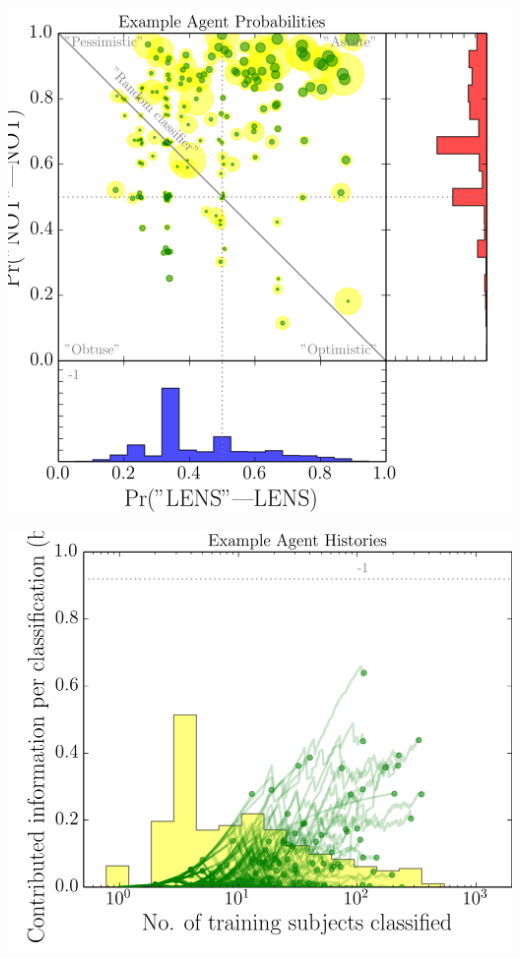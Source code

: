\documentclass[letterpaper,12pt]{article}
\begin{document}
\vspace{-1\baselineskip}
\begin{minipage}{\linewidth}
\begin{minipage}{0.48\linewidth}
\includegraphics[width=\linewidth]{./offline//CFHTLS_now_probabilities.png}
\end{minipage}
\begin{minipage}{0.48\linewidth}
\includegraphics[width=\linewidth]{./offline//CFHTLS_now_histories.png}
\end{minipage}
\end{minipage}
\end{document}

